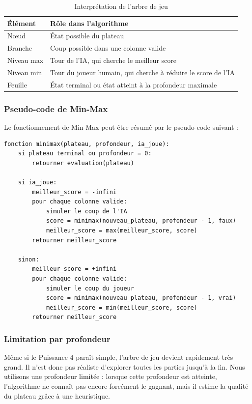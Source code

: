 \documentclass[12pt,a4paper]{article}
\begin{document}
\begin{table}[H]
    \centering
    \begin{tabular}{p{4cm}p{9cm}}
        \toprule
        Élément & Rôle dans l'algorithme \\
        \midrule
        Nœud & État possible du plateau \\
        Branche & Coup possible dans une colonne valide \\
        Niveau max & Tour de l'IA, qui cherche le meilleur score \\
        Niveau min & Tour du joueur humain, qui cherche à réduire le score de l'IA \\
        Feuille & État terminal ou état atteint à la profondeur maximale \\
        \bottomrule
    \end{tabular}
    \caption{Interprétation de l'arbre de jeu}
\end{table}
\newpage
\subsubsection{Pseudo-code de Min-Max}

Le fonctionnement de Min-Max peut être résumé par le pseudo-code suivant :

\begin{lstlisting}[style=pythonstyle, caption={Pseudo-code simplifié de Min-Max}]
fonction minimax(plateau, profondeur, ia_joue):
    si plateau terminal ou profondeur = 0:
        retourner evaluation(plateau)

    si ia_joue:
        meilleur_score = -infini
        pour chaque colonne valide:
            simuler le coup de l'IA
            score = minimax(nouveau_plateau, profondeur - 1, faux)
            meilleur_score = max(meilleur_score, score)
        retourner meilleur_score

    sinon:
        meilleur_score = +infini
        pour chaque colonne valide:
            simuler le coup du joueur
            score = minimax(nouveau_plateau, profondeur - 1, vrai)
            meilleur_score = min(meilleur_score, score)
        retourner meilleur_score
\end{lstlisting}

\subsubsection{Limitation par profondeur}

Même si le Puissance 4 paraît simple, l'arbre de jeu devient rapidement très grand. Il n'est donc pas réaliste d'explorer toutes les parties jusqu'à la fin. Nous utilisons une profondeur limitée : lorsque cette profondeur est atteinte, l'algorithme ne connaît pas encore forcément le gagnant, mais il estime la qualité du plateau grâce à une heuristique.
\end{document}
